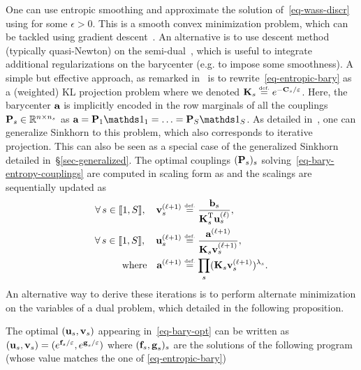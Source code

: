 
One can use entropic smoothing and approximate the solution of~\eqref{eq-wass-discr} using 
for some $\epsilon>0$. 
%
This is a smooth convex minimization problem, which can be tackled using gradient descent~\cite{CuturiBarycenter}. An alternative is to use descent method (typically quasi-Newton) on the semi-dual~\cite{2016-Cuturi-siims}, which is useful to integrate additional regularizations on the barycenter (e.g. to impose some smoothness).
%
A simple but effective approach, as remarked in~\cite{2015-benamou-cisc} is to rewrite~\eqref{eq-entropic-bary} as a (weighted) KL projection problem
where we denoted $\K_s \eqdef e^{-\C_s/\epsilon}$. Here, the barycenter $\a$ is implicitly encoded in the row marginals of all the couplings $\P_s \in \RR^{n \times n_s}$ as $\a = \P_1\ones_1 =  \ldots = \P_S\ones_S$.
%
As detailed in~\cite{2015-benamou-cisc}, one can generalize Sinkhorn to this problem, which also corresponds to iterative projection. This can also be seen as a special case of the generalized Sinkhorn detailed in~\S\ref{sec-generalized}.
%
The optimal couplings $(\P_s)_s$ solving~\eqref{eq-bary-entropy-couplings} are computed in scaling form as 
and the scalings are sequentially updated as
\begin{align}\label{eq-sinkhorn-bary}
	\foralls s \in \range{1,S}, \quad \itt{\vD}_s &\eqdef \frac{\b_s}{\transp{\K}_s \it{\uD}_s}, \\
	\foralls s \in \range{1,S}, \quad  \itt{\uD}_s &\eqdef \frac{\itt{\a}}{\K_s \itt{\vD}_s}, \label{eq-sinkhorn-bary-2}\\
		\qwhereq
		\itt{\a} &\eqdef \prod_s (  \K_s \itt{\vD}_s )^{\la_s}. \label{eq-sinkhorn-bary-3}
\end{align}
An alternative way to derive these iterations is to perform alternate minimization on the variables of a dual problem, which detailed in the following proposition.

\begin{prop}
	The optimal $(\uD_s,\vD_s)$ appearing in~\eqref{eq-bary-opt} can be written as $(\uD_s,\vD_s) = ( e^{\fD_s/\epsilon},e^{\gD_s/\epsilon} )$ where $( \fD_s,\gD_s )_s$ are the solutions of the following program (whose value matches the one of \eqref{eq-entropic-bary})
\end{prop}

